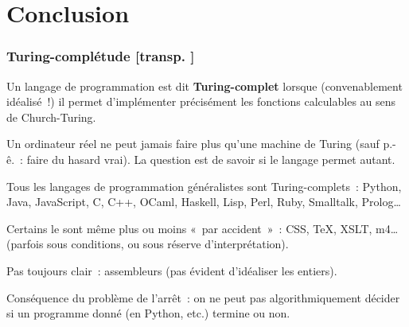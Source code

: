 \documentclass[mathserif,a4paper,aspectratio=169]{beamer}
\newcommand{\itempoint}{\strut\hbox{\color{beamerstructure}\donotcoloroutermaths$\blacktriangleright$}\nobreak\hskip.5em plus.5em\relax}
\newcommand{\donotcoloroutermaths}{\relax}
\renewcommand{\frametitle}[1]{\subsubsection*{#1 {\footnotesize[transp. \insertframenumber]}}}
\newcommand{\myitemmark}{\hbox{$\blacktriangleright$}}
\renewcommand{\itempoint}{\strut\myitemmark\nobreak\hskip.5em plus.5em\relax}
\begin{document}
\section{Conclusion}
%
\begin{frame}
\frametitle{Turing-complétude}

Un langage de programmation est dit \textbf{Turing-complet} lorsque
(convenablement idéalisé !) il permet d'implémenter précisément les
fonctions calculables au sens de Church-Turing.

\bigskip

Un ordinateur réel ne peut \alert{jamais faire plus} qu'une machine de
Turing (sauf p.-ê. : faire du hasard vrai).  La question est de
savoir si le langage permet \alert{autant}.

\bigskip

Tous les langages de programmation généralistes \alert{sont
  Turing-complets} : Python, Java, JavaScript, C, C++, OCaml, Haskell,
Lisp, Perl, Ruby, Smalltalk, Prolog…

\bigskip

Certains le sont même plus ou moins « par accident » : CSS, TeX, XSLT, m4…
(parfois sous conditions, ou sous réserve d'interprétation).

\bigskip

Pas toujours clair : assembleurs (pas évident d'idéaliser les entiers).

\bigskip

Conséquence du problème de l'arrêt : on ne peut pas algorithmiquement
décider si un programme donné (en Python, etc.) termine ou non.

\end{frame}
\end{document}
